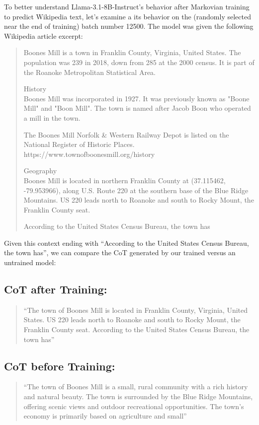 \documentclass{article}
\begin{document}
To better understand Llama-3.1-8B-Instruct's behavior after Markovian training to predict Wikipedia text, let's examine a its behavior on the (randomly selected near the end of training) batch number 12500. The model was given the following Wikipedia article excerpt:

\begin{quote}
Boones Mill is a town in Franklin County, Virginia, United States. The population was 239 in 2018, down from 285 at the 2000 census. It is part of the Roanoke Metropolitan Statistical Area.

History\\
Boones Mill was incorporated in 1927. It was previously known as "Boone Mill" and "Boon Mill". The town is named after Jacob Boon who operated a mill in the town.

The Boones Mill Norfolk \& Western Railway Depot is listed on the National Register of Historic Places.
https://www.townofboonesmill.org/history

Geography\\
Boones Mill is located in northern Franklin County at  (37.115462, -79.953966), along U.S. Route 220 at the southern base of the Blue Ridge Mountains. US 220 leads north  to Roanoke and south  to Rocky Mount, the Franklin County seat.

According to the United States Census Bureau, the town has
\end{quote}

Given this context ending with ``According to the United States Census Bureau, the town has'', we can compare the CoT generated by our trained versus an untrained model:

\subsection{CoT after Training:}
\begin{quote}
``The town of Boones Mill is located in Franklin County, Virginia, United States. US 220 leads north to Roanoke and south to Rocky Mount, the Franklin County seat. According to the United States Census Bureau, the town has''
\end{quote}

\subsection{CoT before Training:}
\begin{quote}
``The town of Boones Mill is a small, rural community with a rich history and natural beauty. The town is surrounded by the Blue Ridge Mountains, offering scenic views and outdoor recreational opportunities. The town's economy is primarily based on agriculture and small''
\end{quote}
\end{document}
